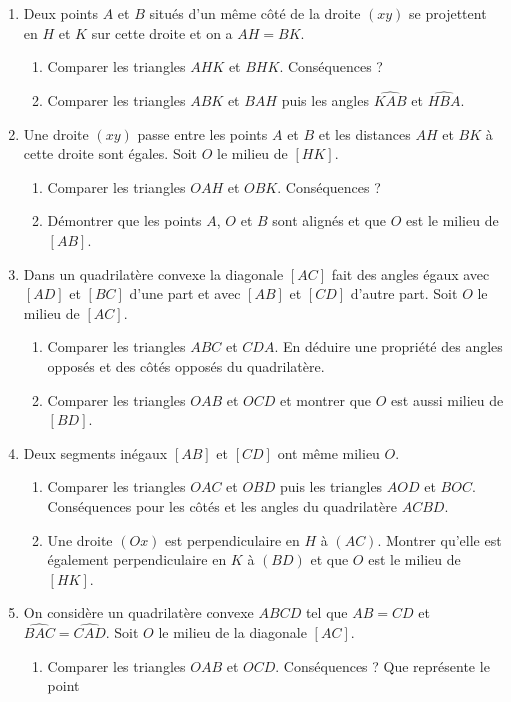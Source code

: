\documentclass[12 pt]{report}
\theoremstyle{plain}
\newcounter{n}
\begin{document}
\begin{enumerate}
\begin{enumerate}
\end{enumerate}
\item Deux points $A$ et $B$ situés d'un même côté de la droite $(xy)$ se projettent
en $H$ et $K$ sur cette droite et on a $AH=BK$. \begin{enumerate}
\item Comparer les triangles $AHK$ et $BHK$. Conséquences ? 
\item Comparer les triangles $ABK$ et $BAH$ puis les angles $\widehat{KAB}$ et $\widehat{HBA}$. 
\end{enumerate}
\item Une droite $(xy)$ passe entre les points $A$ et $B$ et les distances $AH$ et $BK$ à cette droite sont égales. Soit $O$ le milieu de $[HK]$. \begin{enumerate}
\item Comparer les triangles $OAH$ et $OBK$. Conséquences ? 
\item Démontrer que les points $A$, $O$ et $B$ sont alignés et que $O$ est le milieu de $[AB]$. 
\end{enumerate}
\item Dans un quadrilatère convexe la diagonale $[AC]$ fait des angles égaux avec $[AD]$ et $[BC]$ d'une part et avec $[AB]$ et $[CD]$ d'autre part. Soit $O$ le milieu de $[AC]$. \begin{enumerate}
\item Comparer les triangles $ABC$ et $CDA$. En déduire une propriété des angles opposés et des côtés opposés du quadrilatère. 
\item Comparer les triangles $OAB$ et $OCD$ et montrer que $O$ est aussi milieu de $[BD]$. 
\end{enumerate}
\item Deux segments inégaux $[AB]$ et $[CD]$ ont même milieu $O$. \begin{enumerate}
\item Comparer les triangles $OAC$ et $OBD$ puis les triangles $AOD$ et $BOC$. Conséquences pour les côtés et les angles du quadrilatère $ACBD$. 
\item Une droite $(Ox)$ est perpendiculaire en $H$ à $(AC)$. Montrer qu'elle est également perpendiculaire en $K$ à $(BD)$ et que $O$ est le milieu de $[HK]$. 
\end{enumerate}
\item On considère un quadrilatère convexe $ABCD$ tel que $AB=CD$ et $\widehat{BAC}=\widehat{CAD}$. Soit $O$ le milieu de la diagonale $[AC]$.\begin{enumerate}
\item Comparer les triangles $OAB$ et $OCD$. Conséquences ? Que représente le point 

\end{enumerate}
\end{enumerate}
\end{document}
